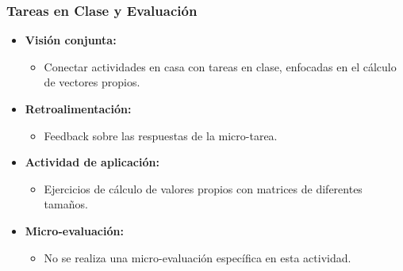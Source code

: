 \begin{frame}
    \frametitle{Tareas en Clase y Evaluación}
    \begin{itemize}
        \item \textbf{Visión conjunta:}
        \begin{itemize}
            \item Conectar actividades en casa con tareas en clase, enfocadas en el cálculo de vectores propios.
        \end{itemize}
        \item \textbf{Retroalimentación:}
        \begin{itemize}
            \item Feedback sobre las respuestas de la micro-tarea.
        \end{itemize}
        \item \textbf{Actividad de aplicación:}
        \begin{itemize}
            \item Ejercicios de cálculo de valores propios con matrices de diferentes tamaños.
        \end{itemize}
        \item \textbf{Micro-evaluación:}
        \begin{itemize}
            \item No se realiza una micro-evaluación específica en esta actividad.
        \end{itemize}
    \end{itemize}
\end{frame}
